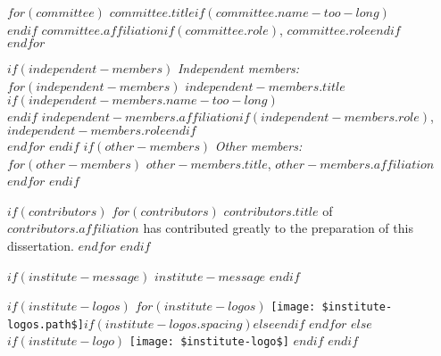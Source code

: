 \begin{titlepage}
\begin{tabbing}
$for(committee)$
        \>$committee.title$$if(committee.name-too-long)$\\
        \>$endif$       \> $committee.affiliation$$if(committee.role)$, $committee.role$$endif$                         \\
$endfor$

$if(independent-members)$
        \>\textit{Independent members:}                                                        \\[\smallskipamount]
$for(independent-members)$
        \>$independent-members.title$$if(independent-members.name-too-long)$\\
        \>$endif$       \> $independent-members.affiliation$$if(independent-members.role)$, $independent-members.role$$endif$                         \\
$endfor$
$endif$
$if(other-members)$
        \>\textit{Other members:}                                                               \\[\smallskipamount]
$for(other-members)$
        \>$other-members.title$, \> $other-members.affiliation$                         \\
$endfor$
$endif$
    \end{tabbing}

$if(contributors)$
    \medskip
$for(contributors)$
    \noindent $contributors.title$ of $contributors.affiliation$ has contributed greatly to the preparation of this dissertation.
$endfor$
$endif$

$if(institute-message)$
    \medskip
    \noindent $institute-message$
$endif$

    \vfill
        \begin{center}
        $if(institute-logos)$
        $for(institute-logos)$
                \texttt{[image: \$institute-logos.path\$]}$if(institute-logos.spacing)$\hspace{$institute-logos.spacing$}$else$\hspace{1cm}$endif$
        $endfor$
        $else$
        $if(institute-logo)$
                \texttt{[image: \$institute-logo\$]}
        $endif$
        $endif$
        \end{center}
    \vfill


\end{titlepage}
